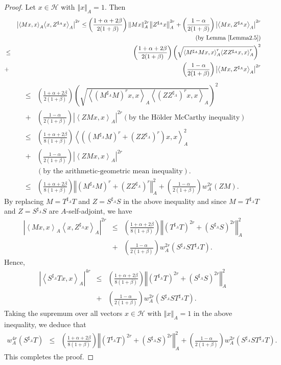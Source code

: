 \documentclass{article}
\newcommand{\bra}[1]{\left(#1\right)}
\newcommand{\seqA}[1]{{\left<#1\right>}_{A}}
\newcommand{\normA}[1]{{\left\Vert#1\right\Vert}_{A}}
\newcommand{\abs}[1]{\left\vert#1\right\vert}
\newcommand {\Sa}{S^{\sharp_{A}}}
\newcommand {\Za}{Z^{\sharp_{A}}}
\newcommand {\Ma}{M^{\sharp_{A}}}
\newcommand {\h}{\mathcal{H}}
\newcommand {\Ta}{T^{\sharp_{A}}}
\begin{document}
\begin{proof} Let $x\in\h$ with $\normA{x}=1$. Then
\begin{eqnarray*}
 && \abs{\seqA{Mx,x}\seqA{x,\Za x}}^{2r} \leq\bra{\frac{1+\alpha+2\beta}{2(1+\beta)}}\normA{Mx}^{2r}\normA{\Za x}^{2r}+\bra{\frac{1-\alpha}{2(1+\beta)}}\abs{\seqA{Mx,\Za x}}^{2r} \\
   &&\bra{\mbox{by Lemma \ref{Lemma2.5}}}\\
   &\leq&\bra{\frac{1+\alpha+2\beta}{2(1+\beta)}}\bra{\sqrt{\seqA{\Ma Mx,x}^{r}\seqA{Z\Za x,x}^{r}}}^{2}\\
   &+&\bra{\frac{1-\alpha}{2(1+\beta)}}\abs{\seqA{Mx,\Za x}}^{2r}
    \end{eqnarray*}
   \begin{eqnarray*}
   &\leq&\bra{\frac{1+\alpha+2\beta}{2(1+\beta)}}\bra{\sqrt{\seqA{\bra{\Ma M}^{r}x,x}\seqA{\bra{Z\Za}^{r} x,x}}}^{2}\\
   &+&\bra{\frac{1-\alpha}{2(1+\beta)}}\abs{\seqA{ZMx, x}}^{2r}\bra{\mbox{by the H\"older McCarthy inequality}}\\
   &\leq& \bra{\frac{1+\alpha+2\beta}{8(1+\beta)}}\seqA{\bra{\bra{\Ma M}^{r}+\bra{Z\Za}^{r}}x,x}^2\\
   &+&\bra{\frac{1-\alpha}{2(1+\beta)}}\abs{\seqA{ZMx, x}}^{2r}\\
   &&\bra{\mbox{by the arithmetic-geometric mean inequality}}.\\
   &\leq& \bra{\frac{1+\alpha+2\beta}{8(1+\beta)}}\normA{\bra{\Ma M}^{r}+\bra{Z\Za}^{r}}^2+ \bra{\frac{1-\alpha}{2(1+\beta)}}w_A^{2r}(ZM).
\end{eqnarray*}
By replacing $M=\Ta T$ and $Z=\Sa S$ in the above inequality and since $M=\Ta T$ and $Z=\Sa S$ are $A$-self-adjoint, we have
\begin{eqnarray*}
 \abs{\seqA{Mx,x}\seqA{x,\Za x}}^{2r}&\leq& \bra{\frac{1+\alpha+2\beta}{8(1+\beta)}}\normA{\bra{\Ta T}^{2r}+\bra{\Sa S}^{2r}}^2\\
 &+&\bra{\frac{1-\alpha}{2(1+\beta)}}w_A^{2r}(\Sa S\Ta T).
\end{eqnarray*}
Hence,
\begin{eqnarray*}
  \abs{\seqA{\Sa Tx,x}}^{4r} &\leq& \bra{\frac{1+\alpha+2\beta}{8(1+\beta)}}\normA{\bra{\Ta T}^{2r}+\bra{\Sa S}^{2r}}^2\\
  &+& \bra{\frac{1-\alpha}{2(1+\beta)}}w_A^{2r}(\Sa S\Ta T).
\end{eqnarray*}
Taking the supremum over all vectors $x\in\h$ with $\normA{x}=1$ in the above inequality, we deduce that
\begin{eqnarray*}
  w_A^{4r} (\Sa T)&\leq& \bra{\frac{1+\alpha+2\beta}{8(1+\beta)}}\normA{\bra{\Ta T}^{2r}
  +\bra{\Sa S}^{2r}}^2+\bra{\frac{1-\alpha}{2(1+\beta)}}w_A^{2r}(\Sa S\Ta T).
\end{eqnarray*}
This completes the proof.
\end{proof}
\end{document}
